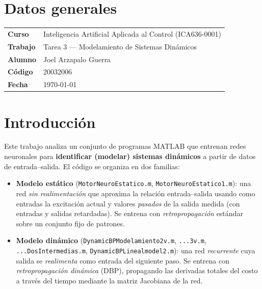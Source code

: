 \documentclass[11pt,a4paper]{article}
\newcommand{\code}[1]{\texttt{\small #1}}
\begin{document}
\section{Datos generales}

\begin{center}
\renewcommand{\arraystretch}{1.3}
\begin{tabular}{ll}
\toprule
\textbf{Curso} & Inteligencia Artificial Aplicada al Control (ICA636-0001) \\
\textbf{Trabajo} & Tarea 3 --- Modelamiento de Sistemas Dinámicos \\
\textbf{Alumno} & Joel Arzapalo Guerra \\
\textbf{Código} & 20032006 \\
\textbf{Fecha} & \today \\
\bottomrule
\end{tabular}
\end{center}

\vspace{0.5cm}

\section{Introducción}

Este trabajo analiza un conjunto de programas MATLAB que entrenan redes neuronales
para \textbf{identificar (modelar) sistemas dinámicos} a partir de datos de entrada--salida.
El código se organiza en dos familias:

\begin{itemize}
  \item \textbf{Modelo estático} (\code{MotorNeuroEstatico.m}, \code{MotorNeuroEstatico1.m}):
        una red \emph{sin realimentación} que aproxima la relación entrada--salida usando como
        entradas la excitación actual y valores \emph{pasados} de la salida medida
        (con entradas y salidas retardadas). Se entrena con \emph{retropropagación}
        estándar sobre un conjunto fijo de patrones.
  \item \textbf{Modelo dinámico} (\code{DynamicBPModelamiento2v.m}, \code{...3v.m},
        \code{...DosIntermedias.m}, \code{DynamicBPLinealmodel2.m}): una red \emph{recurrente}
        cuya salida se \emph{realimenta} como entrada del siguiente paso. Se entrena con
        \emph{retropropagación dinámica} (DBP), propagando las derivadas totales del costo
        a través del tiempo mediante la matriz Jacobiana de la red.
\end{itemize}
\end{document}
